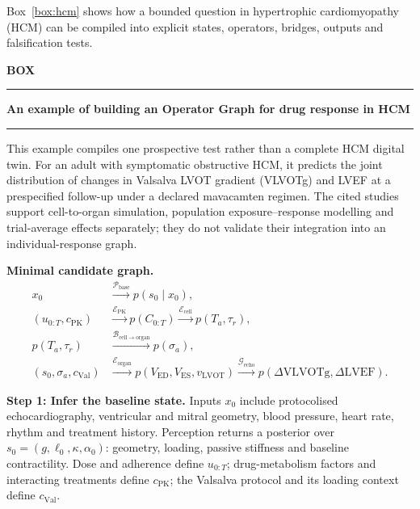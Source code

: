 \documentclass[12pt, letterpaper]{article} %
\newcounter{perspectivebox}
\begin{document}
Box~\ref{box:hcm} shows how a bounded question in hypertrophic cardiomyopathy (HCM) can be compiled into explicit states, operators, bridges, outputs and falsification tests.

\begin{center}
\begingroup
\setlength{\fboxsep}{8pt}
\label{box:hcm}%
\colorbox{PerspectiveBox}{%
\begin{minipage}{\dimexpr\textwidth-2\fboxsep\relax}
\footnotesize
\setlength{\parskip}{0.2em}
\setlength{\abovedisplayskip}{4pt}
\setlength{\belowdisplayskip}{4pt}
\textbf{BOX \theperspectivebox}
\par\smallskip\hrule\smallskip
{\normalsize\textbf{An example of building an Operator Graph for drug response in HCM}\par}
\smallskip\hrule\smallskip

This example compiles one prospective test rather than a complete HCM digital twin. For an adult with symptomatic obstructive HCM, it predicts the joint distribution of changes in Valsalva LVOT gradient (VLVOTg) and LVEF at a prespecified follow-up under a declared mavacamten regimen. The cited studies support cell-to-organ simulation, population exposure--response modelling and trial-average effects separately; they do not validate their integration into an individual-response graph\cite{Margara2022HCM,Merali2024Mavacamten,Olivotto2020ExplorerHCM}.

\textbf{Minimal candidate graph.}
\begin{equation*}
\begin{aligned}
x_0
&\xrightarrow{\mathcal P_{\mathrm{base}}}
p(s_0\mid x_0),\\
(u_{0:T},c_{\mathrm{PK}})
&\xrightarrow{\mathcal E_{\mathrm{PK}}}
p(C_{0:T})
\xrightarrow{\mathcal E_{\mathrm{cell}}}
p(T_a,\tau_r),\\
p(T_a,\tau_r)
&\xrightarrow{\mathcal B_{\mathrm{cell}\rightarrow\mathrm{organ}}}
p(\sigma_a),\\
(s_0,\sigma_a,c_{\mathrm{Val}})
&\xrightarrow{\mathcal E_{\mathrm{organ}}}
p(V_{\mathrm{ED}},V_{\mathrm{ES}},v_{\mathrm{LVOT}})
\xrightarrow{\mathcal G_{\mathrm{echo}}}
p(\Delta\mathrm{VLVOTg},\Delta\mathrm{LVEF}).
\end{aligned}
\end{equation*}

\begin{minipage}[t]{0.485\linewidth}
\vspace{0pt}
\textbf{Step 1: Infer the baseline state.}
Inputs $x_0$ include protocolised echocardiography, ventricular and mitral geometry, blood pressure, heart rate, rhythm and treatment history. Perception returns a posterior over $s_0=(g,\ell_0,\kappa,\alpha_0)$: geometry, loading, passive stiffness and baseline contractility. Dose and adherence define $u_{0:T}$; drug-metabolism factors and interacting treatments define $c_{\mathrm{PK}}$; the Valsalva protocol and its loading context define $c_{\mathrm{Val}}$.


\end{minipage}
\end{minipage}}
\end{center}
\end{document}

